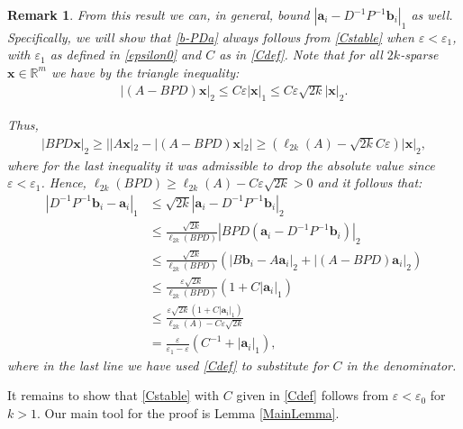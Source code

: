 \documentclass[journal, onecolumn]{IEEEtran}
\newtheorem{remark}{Remark}
\begin{document}
\begin{remark}\label{b-PDaProof}
From this result we can, in general, bound $|\mathbf{a}_i - D^{-1}P^{-1}\mathbf{b}_i|_1$ as well. Specifically, we will show that \eqref{b-PDa} always follows from \eqref{Cstable} when $\varepsilon < \varepsilon_1$, with $\varepsilon_1$ as defined in \eqref{epsilon0} and $C$ as in \eqref{Cdef}. Note that for all $2k$-sparse $\mathbf{x} \in \mathbb{R}^m$ we have by the triangle inequality:
\begin{align*}
|(A-BPD)\mathbf{x}|_2 
\leq C\varepsilon|\mathbf{x}|_1
\leq C \varepsilon \sqrt{2k}  |\mathbf{x}|_2.
\end{align*}

Thus,
\begin{align*}
|BPD\mathbf{x}|_2 
\geq | |A\mathbf{x}|_2 - |(A-BPD)\mathbf{x}|_2 |
\geq (\ell_{2k}(A) - \sqrt{2k}C\varepsilon ) |\mathbf{x}|_2,
\end{align*}
%
where for the last inequality it was admissible to drop the absolute value since $\varepsilon < \varepsilon_1$. Hence, $\ell_{2k}(BPD) \geq \ell_{2k}(A) - C\varepsilon \sqrt{2k} > 0$ and it follows that:
\begin{align*}
|D^{-1}P^{-1}\mathbf{b}_i - \mathbf{a}_i|_1
&\leq \sqrt{2k} |\mathbf{a}_i - D^{-1}P^{-1}\mathbf{b}_i|_2 \\
&\leq \frac{\sqrt{2k}}{\ell_{2k}(BPD)}|BPD(\mathbf{a}_i - D^{-1}P^{-1}\mathbf{b}_i)|_2 \\
&\leq \frac{\sqrt{2k}}{\ell_{2k}(BPD)} (|B\mathbf{b}_i - A\mathbf{a}_i|_2 + |(A - BPD)\mathbf{a}_i|_2) \\
&\leq \frac{\varepsilon\sqrt{2k}}{\ell_{2k}(BPD)}(1+C|\mathbf{a}_i|_1) \\
&\leq \frac{\varepsilon\sqrt{2k}(1+C|\mathbf{a}_i|_1)}{\ell_{2k}(A) - C\varepsilon\sqrt{2k}} \\
&= \frac{\varepsilon }{\varepsilon_1 - \varepsilon} \left( C^{-1}+|\mathbf{a}_i|_1 \right),
\end{align*}
%
where in the last line we have used \eqref{Cdef} to substitute for $C$ in the denominator.  
\end{remark}


It remains to show that \eqref{Cstable} with $C$ given in \eqref{Cdef} follows from $\varepsilon < \varepsilon_0$ for $k > 1$. Our main tool for the proof is Lemma \ref{MainLemma}.


\end{document}
